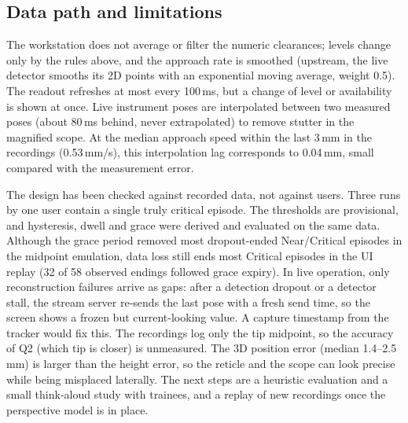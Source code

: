 \subsection{Data path and limitations}\label{sec:viz-limits}

The workstation does not average or filter the numeric clearances; levels change
only by the rules above, and the approach rate is smoothed (upstream, the live
detector smooths its 2D points with an exponential moving average, weight 0.5). The readout refreshes at most every 100\,ms, but a
change of level or availability is shown at once. Live instrument poses are interpolated between two measured poses (about 80\,ms behind, never extrapolated) to remove
stutter in the magnified scope. At the median approach speed within the last 3\,mm in the
recordings (0.53\,mm/s), this interpolation lag corresponds to 0.04\,mm, small compared with the
measurement error.

The design has been checked against recorded data, not against users. Three runs
by one user contain a single truly critical episode. The thresholds are
provisional, and hysteresis, dwell and grace were derived and evaluated on the
same data. Although the grace period removed most dropout-ended Near/Critical episodes
in the midpoint emulation, data loss still ends most Critical episodes in the UI replay
(32 of 58 observed endings followed grace expiry). In live operation, only
reconstruction failures arrive as gaps: after a detection dropout or a detector
stall, the stream server re-sends the last pose with a fresh send time, so the
screen shows a frozen but current-looking value. A capture timestamp from the
tracker would fix this. The recordings log only the tip midpoint, so the accuracy of Q2 (which tip is closer) is unmeasured. The 3D
position error (median 1.4--2.5\,mm) is larger than the height error, so the
reticle and the scope can look precise while being misplaced laterally. The next
steps are a heuristic evaluation and a small think-aloud study with trainees, and
a replay of new recordings once the perspective model is in place.
